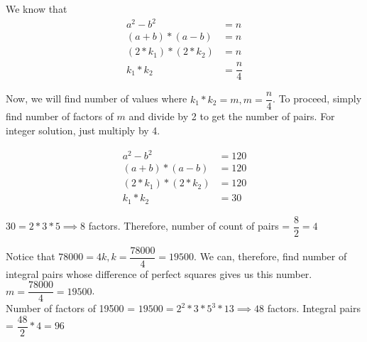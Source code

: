 We know that 
\begin{align*}
    a^2 - b^2 &= n \\
    (a + b) * (a - b) &= n \\
    (2 * k_1) * (2 * k_2) &= n \tag{Since we want even * even, we can write $(a+b)$ and $(a-b)$ as even numbers} \\
    k_1 * k_2 &= \dfrac{n}{4}
\end{align*}

Now, we will find number of values where $k_1 * k_2 = m, m = \dfrac{n}{4}$. To proceed, simply find number of factors of $m$ and divide by 2 to get the number of pairs. For integer solution, just multiply by 4. 


\begin{align*}
    a^2 - b^2 &= 120 \\
    (a+b) * (a-b) &= 120 \\
    (2 * k_1) * (2 * k_2) &= 120 \tag{We want $(a+b), (a-b)$ to be even} \\
    k_1 * k_2 &= 30 
\end{align*}

$30 = 2 * 3 * 5 \implies 8$ factors. Therefore, number of count of pairs = $\dfrac{8}{2} = 4$

Notice that $78000 = 4k, k = \dfrac{78000}{4} = 19500$. We can, therefore, find number of integral pairs whose difference of perfect squares gives us this number. $m = \dfrac{78000}{4} = 19500$. \\

Number of factors of 19500 = $19500 = 2^2 * 3 * 5^3 * 13 \implies 48$ factors. Integral pairs = $\dfrac{48}{2} * 4 = 96$